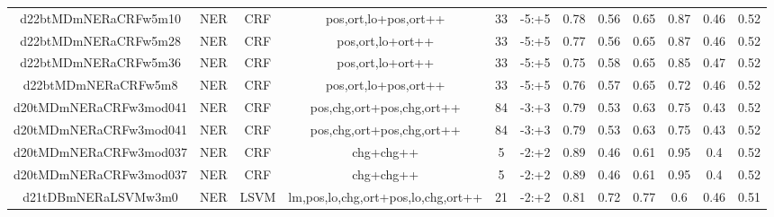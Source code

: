 \documentclass[a4paper]{article}
\begin{document}
\begin{landscape}
\begin{center}
\begin{tabular}{ |c|c|c|c|c|c|c|c|c|c|c|c|}
 	
 
 	
 		
 		\small{ d22btMDmNERaCRFw5m10 } & NER & CRF & pos,ort,lo+pos,ort++  &  33 &  -5:+5  &  0.78 & 0.56 & 0.65  &  0.87 & 0.46 & 0.52 \\
 		

 	
 
 	
 		
 		\small{ d22btMDmNERaCRFw5m28 } & NER & CRF & pos,ort,lo+ort++  &  33 &  -5:+5  &  0.77 & 0.56 & 0.65  &  0.87 & 0.46 & 0.52 \\
 		

 	
 
 	
 		
 		\small{ d22btMDmNERaCRFw5m36 } & NER & CRF & pos,ort,lo+ort++  &  33 &  -5:+5  &  0.75 & 0.58 & 0.65  &  0.85 & 0.47 & 0.52 \\
 		

 	
 
 	
 		
 		\small{ d22btMDmNERaCRFw5m8 } & NER & CRF & pos,ort,lo+pos,ort++  &  33 &  -5:+5  &  0.76 & 0.57 & 0.65  &  0.72 & 0.46 & 0.52 \\
 		

 	
 
 	
 		
 		\small{ d20tMDmNERaCRFw3mod041 } & NER & CRF & pos,chg,ort+pos,chg,ort++  &  84 &  -3:+3  &  0.79 & 0.53 & 0.63  &  0.75 & 0.43 & 0.52 \\
 		

 	
 
 	
 		
 		\small{ d20tMDmNERaCRFw3mod041 } & NER & CRF & pos,chg,ort+pos,chg,ort++  &  84 &  -3:+3  &  0.79 & 0.53 & 0.63  &  0.75 & 0.43 & 0.52 \\
 		

 	
 
 	
 		
 		\small{ d20tMDmNERaCRFw3mod037 } & NER & CRF & chg+chg++  &  5 &  -2:+2  &  0.89 & 0.46 & 0.61  &  0.95 & 0.4 & 0.52 \\
 		

 	
 
 	
 		
 		\small{ d20tMDmNERaCRFw3mod037 } & NER & CRF & chg+chg++  &  5 &  -2:+2  &  0.89 & 0.46 & 0.61  &  0.95 & 0.4 & 0.52 \\
 		

 	
 
 	
 		
 		\small{ d21tDBmNERaLSVMw3m0 } & NER & LSVM & lm,pos,lo,chg,ort+pos,lo,chg,ort++  &  21 &  -2:+2  &  0.81 & 0.72 & 0.77  &  0.6 & 0.46 & 0.51 \\
 		


\end{tabular}
\end{center}
\end{landscape}
\end{document}
